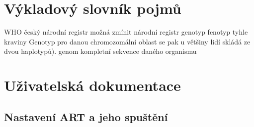\documentclass[czech,DP]{thesiskiv}
\numberwithin{equation}{section}
\begin{document}
\chapter{Výkladový slovník pojmů}
WHO
český národní registr 
možná zmínit národní registr
genotyp 
fenotyp tyhle kraviny
Genotyp pro danou chromozomální oblast se pak u většiny lidí skládá ze dvou haplotypů).
genom kompletní sekvence daného organismu


% 
%
\nocite{*}

{\raggedright\small

}


\appendix
\chapter{Uživatelská dokumentace}

\section{Nastavení ART a jeho spuštění}
\end{document}
